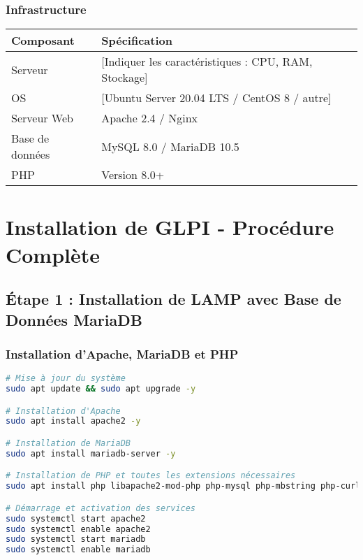 \documentclass[12pt,a4paper]{article}
\begin{document}
\subsubsection{Infrastructure}
\begin{center}
\begin{tabular}{|l|l|}
\hline
\textbf{Composant} & \textbf{Spécification} \\
\hline
Serveur & [Indiquer les caractéristiques : CPU, RAM, Stockage] \\
OS & [Ubuntu Server 20.04 LTS / CentOS 8 / autre] \\
Serveur Web & Apache 2.4 / Nginx \\
Base de données & MySQL 8.0 / MariaDB 10.5 \\
PHP & Version 8.0+ \\
\hline
\end{tabular}
\end{center}

\section{Installation de GLPI - Procédure Complète}

\subsection{Étape 1 : Installation de LAMP avec Base de Données MariaDB}

\subsubsection{Installation d'Apache, MariaDB et PHP}
\begin{lstlisting}[language=bash, caption=Installation complète de LAMP]
# Mise à jour du système
sudo apt update && sudo apt upgrade -y

# Installation d'Apache
sudo apt install apache2 -y

# Installation de MariaDB
sudo apt install mariadb-server -y

# Installation de PHP et toutes les extensions nécessaires
sudo apt install php libapache2-mod-php php-mysql php-mbstring php-curl php-gd php-xml php-zip php-intl php-ldap php-imap php-snmp php-cas php-apcu -y

# Démarrage et activation des services
sudo systemctl start apache2
sudo systemctl enable apache2
sudo systemctl start mariadb
sudo systemctl enable mariadb
\end{lstlisting}
\end{document}
